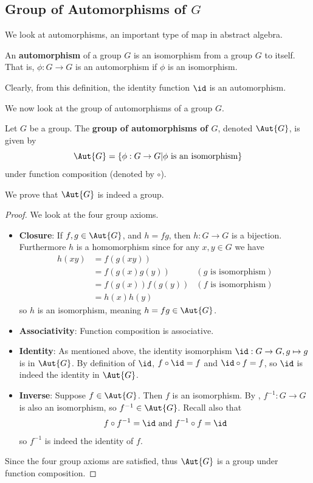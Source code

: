 \subsection{Group of Automorphisms of \texorpdfstring{$G$}{G}}
We look at automorphisms, an important type of map in abstract algebra.
\begin{definition}
    An \textbf{automorphism} of a group $G$ is an isomorphism from a group $G$ to itself. That is, $\phi: G \to G$ is an automorphism if $\phi$ is an isomorphism.
\end{definition}
Clearly, from this definition, the identity function $\id$ is an automorphism.

We now look at the group of automorphisms of a group $G$.
\begin{definition}
    Let $G$ be a group. The \textbf{group of automorphisms of $G$}, denoted $\Aut{G}$, is given by
    \[
        \Aut{G} = \{\phi: G \to G \vert \phi \text{ is an isomorphism}\}
    \]
    under function composition (denoted by $\circ$).
\end{definition}
We prove that $\Aut{G}$ is indeed a group.

\newpage

\begin{proof}
    We look at the four group axioms.
    \begin{itemize}
        \item \textbf{Closure}: If $f, g \in \Aut{G}$, and $h = fg$, then $h: G \to G$ is a bijection. Furthermore $h$ is a homomorphism since for any $x, y \in G$ we have
        \begin{align*}
            h(xy) &= f(g(xy))\\
            &= f(g(x)g(y)) & (g \text{ is isomorphism})\\
            &= f(g(x))f(g(y)) & (f \text{ is isomorphism})\\
            &= h(x)h(y)
        \end{align*}
        so $h$ is an isomorphism, meaning $h = fg \in \Aut{G}$.

        \item \textbf{Associativity}: Function composition is associative.

        \item \textbf{Identity}: As mentioned above, the identity isomorphism $\id: G \to G, g \mapsto g$ is in $\Aut{G}$. By definition of $\id$, $f \circ \id = f$ and $\id \circ f = f$, so $\id$ is indeed the identity in $\Aut{G}$.

        \item \textbf{Inverse}: Suppose $f \in \Aut{G}$. Then $f$ is an isomorphism. By , $f^{-1}: G \to G$ is also an isomorphism, so $f^{-1} \in \Aut{G}$. Recall also that
        \[
            f\circ f^{-1} = \id \text{ and } f^{-1}\circ f = \id
        \]
        so $f^{-1}$ is indeed the identity of $f$.
    \end{itemize}
    Since the four group axioms are satisfied, thus $\Aut{G}$ is a group under function composition.
\end{proof}

